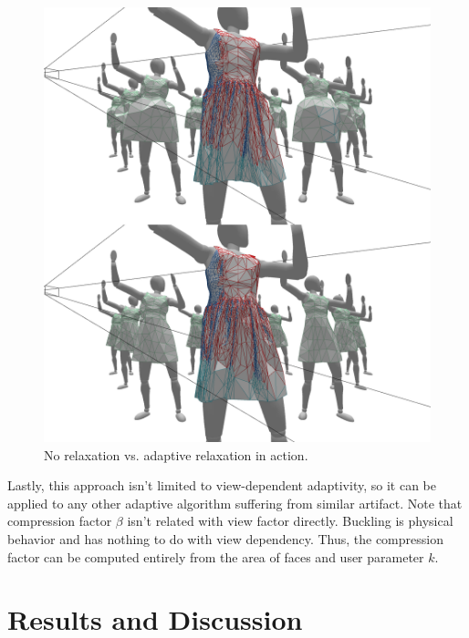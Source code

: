 \documentclass[10pt,journal,compsoc,twoside]{TexInputs/IEEEtran}
\begin{document}
\begin{figure}[t]
  \centering
  \includegraphics[width=1.0\columnwidth]{subelement_compression/no_vs_adaptive}
  \caption{No relaxation vs. adaptive relaxation in action.}
  \label{fig:no_vs_adaptive}
\end{figure}

Lastly, this approach isn't limited to view-dependent adaptivity, so it can be applied to
any other adaptive algorithm suffering from similar artifact.  Note that compression
factor $\beta$ isn't related with view factor directly. Buckling is physical behavior and
has nothing to do with view dependency. Thus, the compression factor can be computed
entirely from the area of faces and user parameter $k$.


\section{Results and Discussion}
\end{document}
